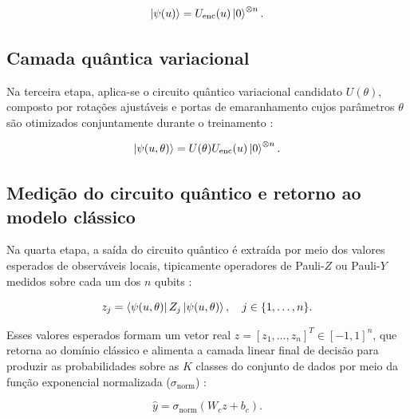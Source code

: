 \documentclass[
    12pt,
    openright,
    oneside,
    a4paper,
    english,
    brazil
]{abntex2}
\begin{document}
\begin{equation}
\label{eq:estado_codificado_hibrido}
\ket{\psi(u)}
=
U_{\text{enc}}(u)
\ket{0}^{\otimes n}.
\end{equation}

\subsection{Camada quântica variacional}
\label{subsec:camada_quantica_variacional}

Na terceira etapa, aplica-se o circuito quântico variacional candidato \(U(\theta)\), composto por rotações ajustáveis e portas de emaranhamento cujos parâmetros \(\theta\) são otimizados conjuntamente durante o treinamento \cite{cerezo2021variational,bergholm2018pennylane}:

\begin{equation}
\label{eq:estado_variacional_hibrido}
\ket{\psi(u,\theta)}
=
U(\theta)
U_{\text{enc}}(u)
\ket{0}^{\otimes n}.
\end{equation}

\subsection{Medição do circuito quântico e retorno ao modelo clássico}
\label{subsec:medicao_retorno_modelo_classico}

Na quarta etapa, a saída do circuito quântico é extraída por meio dos valores esperados de observáveis locais, tipicamente operadores de Pauli-\(Z\) ou Pauli-\(Y\) medidos sobre cada um dos \(n\) qubits \cite{cerezo2021variational,senokosov2024qml}:

\begin{equation}
\label{eq:medicao_hibrido}
z_j =
\bra{\psi(u,\theta)}
Z_j
\ket{\psi(u,\theta)},
\quad j \in \{1, \dots, n\}.
\end{equation}

Esses valores esperados formam um vetor real \(z = [z_1, \dots, z_n]^T \in [-1, 1]^n\), que retorna ao domínio clássico e alimenta a camada linear final de decisão para produzir as probabilidades sobre as \(K\) classes do conjunto de dados por meio da função exponencial normalizada (\(\sigma_{\text{norm}}\)) \cite{senokosov2024qml,bergholm2018pennylane}:

\begin{equation}
\label{eq:saida_hibrida}
\hat{y}
=
\sigma_{\text{norm}}(W_c z + b_c).
\end{equation}
\end{document}
